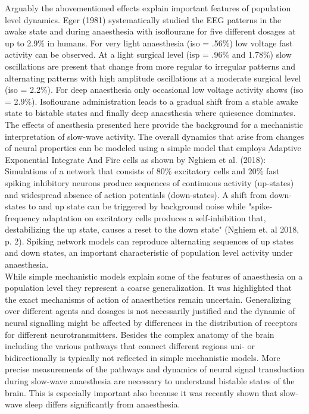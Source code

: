 Arguably the abovementioned effects explain important features of population level dynamics. Eger (1981) systematically studied the EEG patterns in the awake state and during anaesthesia with isoflourane for five different dosages at up to 2.9\% in humans. For very light anaesthesia (iso = .56\%) low voltage fast activity can be observed. At a light surgical level (isp = .96\% and 1.78\%) slow oscillations are present that change from more regular to irregular patterns and alternating patterns with high amplitude oscillations at a moderate surgical level (iso = 2.2\%). For deep anaesthesia only occasional low voltage activity shows (iso = 2.9\%). Isoflourane administration leads to a gradual shift from a stable awake state to bistable states and finally deep anaesthesia where quiesence dominates.\\
The effects of anesthesia presented here provide the background for a mechanistic interpretation of slow-wave activity. The overall dynamics that arise from changes of neural properties can be modeled using a simple model that employs Adaptive Exponential Integrate And Fire cells as shown by Nghiem et al. (2018): Simulations of a network that consists of 80\% excitatory cells and 20\% fast spiking inhibitory neurons produce sequences of continuous activity (up-states) and widespread absence of action potentials (down-states). A shift from down-states to and up state can be triggered by background noise while "spike-frequency adaptation on excitatory cells produces a self-inhibition that, destabilizing the up state, causes a reset to the down state" (Nghiem et. al 2018, p. 2). Spiking network models can reproduce alternating sequences of up states and down states, an important characteristic of population level activity under anaesthesia. \\
While simple mechanistic models explain some of the features of anaesthesia on a population level they represent a coarse generalization. It was highlighted that the exact mechanisms of action of anaesthetics remain uncertain. Generalizing over different agents and dosages is not necessarily justified and the dynamic of neural signalling might be affected by differences in the distribution of receptors for different neurotransmitters. Besides the complex anatomy of the brain including the various pathways that connect different regions uni- or bidirectionally is typically not reflected in simple mechanistic models. More precise measurements of the pathways and dynamics of neural signal transduction during slow-wave anaesthesia are necessary to understand bistable states of the brain. This is especially important also because it was recently shown that slow-wave sleep differs significantly from anaesthesia.

